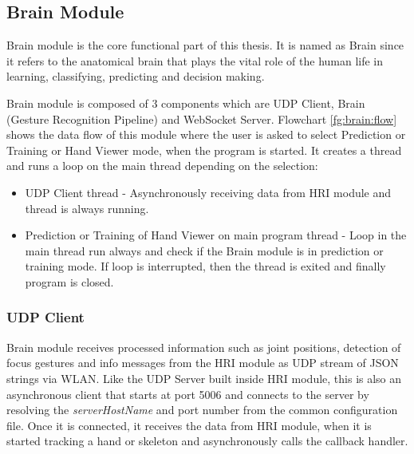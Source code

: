 \subsection{Brain Module} Brain module is the core functional part of this thesis. It is named as Brain since it refers to the anatomical brain that plays the vital role of the human life in learning, classifying, predicting and decision making. 

Brain module is composed of 3 components which are UDP Client, Brain (Gesture Recognition Pipeline) and WebSocket Server. Flowchart \ref{fg:brain:flow} shows the data flow of this module where the user is asked to select Prediction or Training or Hand Viewer mode, when the program is started. It creates a thread and runs a loop on the main thread depending on the selection: 
\begin{itemize}
	\item UDP Client thread - Asynchronously receiving data from HRI module and thread is always running. 
	\item Prediction or Training of Hand Viewer on main program thread - Loop in the main thread run always and check if the Brain module is in prediction or training mode. If loop is interrupted, then the thread is exited and finally program is closed. 
\end{itemize}



\subsubsection{UDP Client} Brain module receives processed information such as joint positions, detection of focus gestures and info messages from the HRI module as UDP stream of JSON strings via WLAN. Like the UDP Server built inside HRI module, this is also an asynchronous client that starts at port 5006 and connects to the server by resolving the \textit{serverHostName} and port number from the common configuration file. Once it is connected, it receives the data from HRI module, when it is started tracking a hand or skeleton and asynchronously calls the callback handler.

